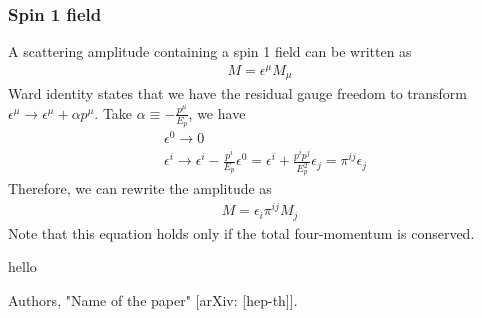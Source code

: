 \documentclass[11pt,a4paper]{article}
\newcommand{\ie}{\begin{equation}\begin{aligned}}
\newcommand{\fe}{\end{aligned}\end{equation}}
\begin{document}
\subsubsection{Spin 1 field}
A scattering amplitude containing a spin 1 field can be written as 
\ie
M = \epsilon^\mu M_\mu
\fe
Ward identity states that we have the residual gauge freedom to transform $\epsilon^\mu \rightarrow \epsilon^\mu + \alpha p^\mu$. Take $\alpha \equiv -\frac{p^\mu}{E_p}$, we have
\ie
&\epsilon^0 \rightarrow 0
\\
&\epsilon^i \rightarrow \epsilon^i - \frac{p^i}{E_p}\epsilon^0 = \epsilon^i + \frac{p^i p^j}{E_p^2}\epsilon_j = \pi^{ij} \epsilon_j
\fe
Therefore, we can rewrite the amplitude as
\ie
\label{eqn: spin 1 amplitude written in pi_ij}
M = \epsilon_i \pi^{ij} M_j
\fe
Note that this equation holds only if the total four-momentum is conserved.

hello




\begin{thebibliography}{99}


Authors,
"Name of the paper"
[arXiv: [hep-th]].


\end{thebibliography}
\end{document}
